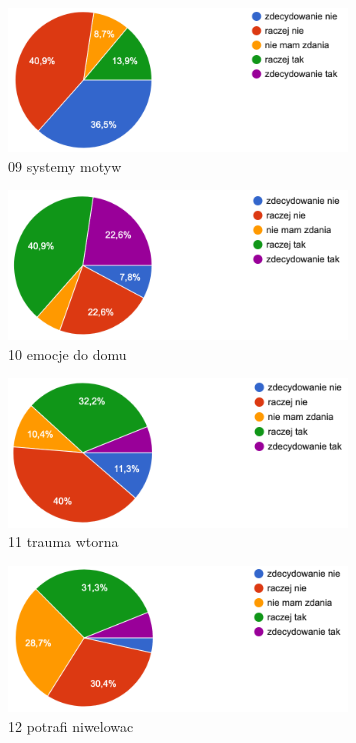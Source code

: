 \documentclass[a4paper,12pt,twoside,openany]{report}
\begin{document}
\begin{figure}
    \includegraphics[width=9cm]{wyniki/09_systemy_motyw}
    \caption{ 09 systemy motyw }
\end{figure}

\begin{figure}
    \includegraphics[width=9cm]{wyniki/10_emocje_do_domu}
    \caption{ 10 emocje do domu }
\end{figure}

\begin{figure}
    \includegraphics[width=9cm]{wyniki/11_trauma_wtorna}
    \caption{ 11 trauma wtorna }
\end{figure}

\begin{figure}
    \includegraphics[width=9cm]{wyniki/12_potrafi_niwelowac}
    \caption{ 12 potrafi niwelowac }
\end{figure}
\end{document}
